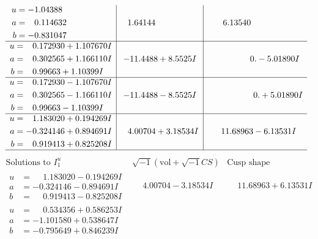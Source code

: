 \documentclass[1p]{elsarticle_modified}
\theoremstyle{definition}
\newcommand{\I}{\sqrt{-1}}
\begin{document}
$$\begin{array}{c|c|c}
\begin{aligned}
u &= -1.04388\phantom{ +0.000000I} \\
a &= \phantom{-}0.114632\phantom{ +0.000000I} \\
b &= -0.831047\phantom{ +0.000000I}\end{aligned}
 & \phantom{-}1.64144\phantom{ +0.000000I} & \phantom{-}6.13540\phantom{ +0.000000I} \\ \hline\begin{aligned}
u &= \phantom{-}0.172930 + 1.107670 I \\
a &= \phantom{-}0.302565 + 1.166110 I \\
b &= \phantom{-}0.99663 + 1.10399 I\end{aligned}
 & -11.4488 + 8.5525 I & \phantom{-0.000000 } 0. - 5.01890 I \\ \hline\begin{aligned}
u &= \phantom{-}0.172930 - 1.107670 I \\
a &= \phantom{-}0.302565 - 1.166110 I \\
b &= \phantom{-}0.99663 - 1.10399 I\end{aligned}
 & -11.4488 - 8.5525 I & \phantom{-0.000000 -}0. + 5.01890 I \\ \hline\begin{aligned}
u &= \phantom{-}1.183020 + 0.194269 I \\
a &= -0.324146 + 0.894691 I \\
b &= \phantom{-}0.919413 + 0.825208 I\end{aligned}
 & \phantom{-}4.00704 + 3.18534 I & \phantom{-}11.68963 - 6.13531 I\\
 \hline 
 \end{array}$$\newpage$$\begin{array}{c|c|c}  
\text{Solutions to }I^u_{1}& \I (\text{vol} + \sqrt{-1}CS) & \text{Cusp shape}\\
 \hline 
\begin{aligned}
u &= \phantom{-}1.183020 - 0.194269 I \\
a &= -0.324146 - 0.894691 I \\
b &= \phantom{-}0.919413 - 0.825208 I\end{aligned}
 & \phantom{-}4.00704 - 3.18534 I & \phantom{-}11.68963 + 6.13531 I \\ \hline\begin{aligned}
u &= \phantom{-}0.534356 + 0.586253 I \\
a &= -1.101580 + 0.538647 I \\
b &= -0.795649 + 0.846239 I\end{aligned}

\end{array}$$
\end{document}
